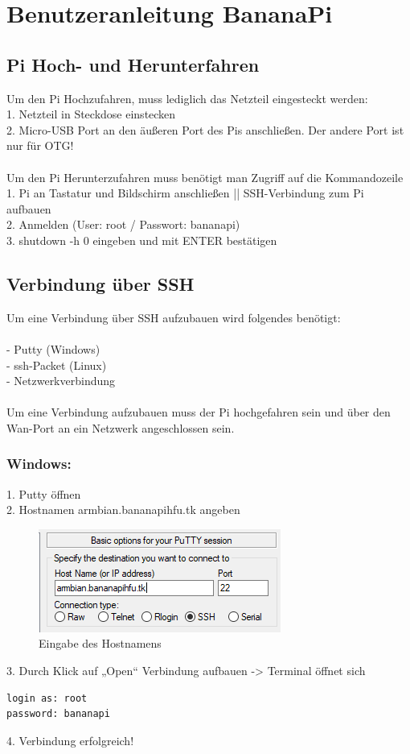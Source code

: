 \chapter{Benutzeranleitung BananaPi}

\section{Pi Hoch- und Herunterfahren}
Um den Pi Hochzufahren, muss lediglich das Netzteil eingesteckt werden:\\
1. Netzteil in Steckdose einstecken\\
2. Micro-USB Port an den äußeren Port des Pis anschließen. Der andere Port ist nur für OTG!\\
~\\
Um den Pi Herunterzufahren muss benötigt man Zugriff auf die Kommandozeile\\
1. Pi an Tastatur und Bildschirm anschließen || SSH-Verbindung zum Pi aufbauen\\
2. Anmelden (User: root / Passwort: bananapi)\\
3. shutdown -h 0 eingeben und mit ENTER bestätigen\\

\section{Verbindung über SSH}
Um eine Verbindung über SSH aufzubauen wird folgendes benötigt:\\
~\\
- Putty (Windows)\\
- ssh-Packet (Linux)\\
- Netzwerkverbindung\\
~\\
Um eine Verbindung aufzubauen muss der Pi hochgefahren sein und über den Wan-Port an ein Netzwerk angeschlossen sein.
\newpage
\subsection*{Windows:}
1. Putty öffnen\\
2. Hostnamen armbian.bananapihfu.tk angeben
\begin{figure}[ht]
\includegraphics[width=.6\textwidth]{pictures/Jonas/Anleitung/BILD1}
\caption{Eingabe des Hostnamens}
\end{figure}
3. Durch Klick auf „Open“ Verbindung aufbauen -> Terminal öffnet sich
\begin{lstlisting}
login as: root
password: bananapi
\end{lstlisting}
4. Verbindung erfolgreich!

